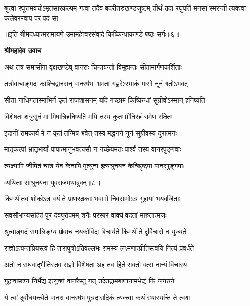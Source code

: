 \fourlineindentedshloka
{श्रुत्वा रघूत्तमवचोऽमृतसारकल्पम्}
{गत्वा तदैव बदरीतरुखण्डजुष्टम्}
{तीर्थं तदा रघुपतिं मनसा स्मरन्ती}
{त्यक्त्वा कलेवरमवाप परं पदं सा} %

{॥इति श्रीमदध्यात्मरामायणे उमामहेश्वरसंवादे किष्किन्धाकाण्डे
षष्ठः सर्गः॥६॥
}




\textbf{श्रीमहादेव उवाच}

\twolineshloka
{अथ तत्र समासीना वृक्षखण्डेषु वानराः}
{चिन्तयन्तो विमुह्यन्तः सीतामार्गणकर्शिताः} %

\twolineshloka
{तत्रोवाचाङ्गदः कांश्चिद्वानरान् वानरर्षभः}
{भ्रमतां गह्वरेऽस्माकं मासो नूनं गतोऽभवत्} %

\twolineshloka
{सीता नाधिगतास्माभिर्न कृतं राजशासनम्}
{यदि गच्छाम किष्किन्धां सुग्रीवोऽस्मान् हनिष्यति} %

\twolineshloka
{विशेषतः शत्रुसुतं मां मिषान्निहनिष्यति}
{मयि तस्य कुतः प्रीतिरहं रामेण रक्षितः} %

\twolineshloka
{इदानीं रामकार्यं मे न कृतं तन्मिषं भवेत्}
{तस्य मद्धनने नूनं सुग्रीवस्य दुरात्मनः} %

\twolineshloka
{मातृकल्पां भ्रातृभार्यां पापात्मानुभवत्यसौ}
{न गच्छेयमतः पार्श्वं तस्य वानरपुङ्गवाः} %

\twolineshloka
{त्यक्ष्यामि जीवितं चात्र येन केनापि मृत्युना}
{इत्यश्रुनयनं केचिद्दृष्ट्वा वानरपुङ्गवाः} %

{व्यथिताः साश्रुनयना युवराजमथाब्रुवन्॥८॥} %


\twolineshloka
{किमर्थं तव शोकोऽत्र वयं ते प्राणरक्षकाः}
{भवामो निवसामोऽत्र गुहायां भयवर्जिताः} %

\twolineshloka
{सर्वसौभाग्यसहितं पुरं देवपुरोपमम्}
{शनैः परस्परं वाक्यं वदतां मारुतात्मजः} %

\twolineshloka
{श्रुत्वाङ्गदं समालिङ्ग्य प्रोवाच नयकोविदः}
{विचार्यते किमर्थं ते दुर्विचारो न युज्यते} %

\twolineshloka
{राज्ञोऽत्यन्तप्रियस्त्वं हि तारापुत्रोऽतिवल्लभः}
{रामस्य लक्ष्मणात्प्रीतिस्त्वयि नित्यं प्रवर्धते} %

\twolineshloka
{अतो न राघवाद्भीतिस्तव राज्ञो विशेषतः}
{अहं तव हिते सक्तो वत्स नान्यं विचारय} %

\twolineshloka
{गुहावासश्च निर्भेद्य इत्युक्तं वानरैस्तु यत्}
{तदेतद्रामबाणानामभेद्यं किं जगत्त्रये} %

\twolineshloka
{ये त्वां दुर्बोधयन्त्येते वानरा वानरर्षभ}
{पुत्रदारादिकं त्यक्त्वा कथं स्थास्यन्ति ते त्वया} %


